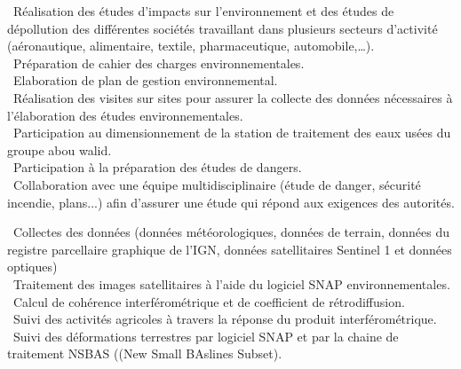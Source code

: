 \documentclass[
  a4paper, 
]{fortysecondscv}
\begin{document}
\makefrontsidebar
{}
\begin{cvtable}
		{\faArrowCircleRight\ Réalisation des études d’impacts sur l’environnement et des études de dépollution des différentes sociétés travaillant dans plusieurs secteurs d’activité (aéronautique, alimentaire, textile, pharmaceutique, automobile,…).
		\\ \faArrowCircleRight\ Préparation de cahier des charges environnementales.
		\\ \faArrowCircleRight\ Elaboration de plan de gestion environnemental.
		\\ \faArrowCircleRight\ Réalisation des visites sur sites pour assurer la collecte des données nécessaires à l’élaboration des études environnementales.
		\\ \faArrowCircleRight\ Participation au dimensionnement de la station de traitement des eaux usées du groupe abou walid.
		\\ \faArrowCircleRight\ Participation  à la préparation des études de dangers.
		\\ \faArrowCircleRight\ Collaboration avec une équipe multidisciplinaire (étude de danger, sécurité incendie, plans...)  afin d’assurer une étude qui répond aux exigences des autorités.}
			
	{\faArrowCircleRight\ Collectes des données (données météorologiques, données de terrain, données du registre parcellaire graphique de l’IGN, données satellitaires Sentinel 1 et données optiques)
		\\ \faArrowCircleRight\ Traitement des images  satellitaires à l’aide du logiciel SNAP environnementales.
		\\ \faArrowCircleRight\ Calcul de cohérence interférométrique et de coefficient de rétrodiffusion.
		\\ \faArrowCircleRight\ Suivi des activités agricoles à travers la réponse du produit interférométrique.
		\\ \faArrowCircleRight\ Suivi des déformations terrestres par logiciel SNAP et par la chaine de traitement NSBAS ((New Small BAslines Subset).}
\end{cvtable}
\end{document}
